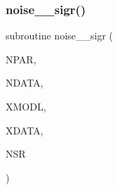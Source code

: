 \subsubsection{\texorpdfstring{noise\+\_\+\_\+sigr()}{noise\_2\_sigr()}}
{\footnotesize\ttfamily subroutine noise\+\_\+\_\+sigr (\begin{DoxyParamCaption}\item[{integer, intent(in)}]{N\+P\+AR,  }\item[{integer, intent(in)}]{N\+D\+A\+TA,  }\item[{real, dimension(ndata), intent(in)}]{X\+M\+O\+DL,  }\item[{real, dimension(ndata), intent(in)}]{X\+D\+A\+TA,  }\item[{real, intent(out)}]{N\+SR }\end{DoxyParamCaption})}

\mbox{\label{Leroi__c_8f90_ae4548433d1a40c9ae5dce4d7404c9404}} 
